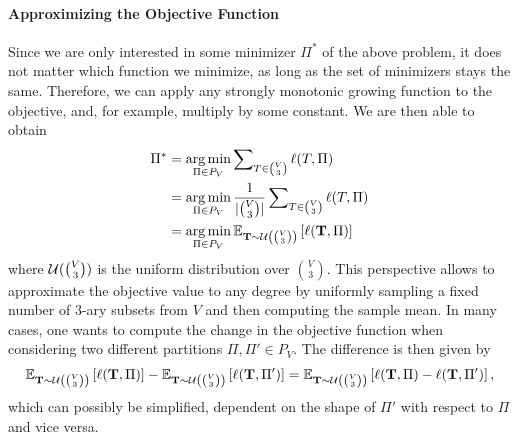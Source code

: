 \paragraph{Approximizing the Objective Function}
Since we are only interested in some minimizer $\Pi^*$ of the above problem, it does not matter which function we minimize, as long as the set of minimizers stays the same. Therefore, we can apply any strongly monotonic growing function to the objective, and, for example, multiply by some constant. We are then able to obtain
\begin{align*}
    \Pi^* &= \operatorname*{\arg\min}_{\Pi \in P_V} \sum\nolimits_{T\in\binom{V}{3}} \ell(T,\Pi) \\
    &= \operatorname*{\arg\min}_{\Pi \in P_V} \frac{1}{|\binom{V}{3}|} \sum\nolimits_{T\in\binom{V}{3}} \ell(T,\Pi) \\
    &= \operatorname*{\arg\min}_{\Pi \in P_V} \mathbb{E}_{{\bf T} \sim \mathcal{U}\left(\binom{V}{3}\right)} \left[\ell({\bf T}, \Pi)\right]
\end{align*}
where $\mathcal{U}(\binom{V}{3})$ is the uniform distribution over $\binom{V}{3}$. This perspective allows to approximate the objective value to any degree by uniformly sampling a fixed number of $3$-ary subsets from $V$ and then computing the sample mean. In many cases, one wants to compute the change in the objective function when considering two different partitions $\Pi,\Pi' \in P_V$. The difference is then given by
\begin{align*}
    \mathbb{E}_{{\bf T} \sim \mathcal{U}\left(\binom{V}{3}\right)} \left[\ell({\bf T}, \Pi)\right] - \mathbb{E}_{{\bf T} \sim \mathcal{U}\left(\binom{V}{3}\right)} \left[\ell({\bf T}, \Pi')\right] = \mathbb{E}_{{\bf T} \sim \mathcal{U}\left(\binom{V}{3}\right)} \left[\ell({\bf T}, \Pi) - \ell({\bf T}, \Pi')\right],
\end{align*}
which can possibly be simplified, dependent on the shape of $\Pi'$ with respect to $\Pi$ and vice versa.